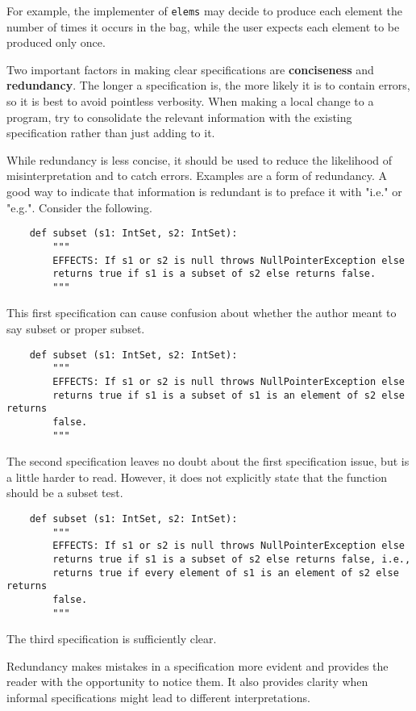 \documentclass[oneside,11pt,dvipsnames]{book}
\newcommand{\code}[1]{\texttt{#1}}
\begin{document}
For example, the implementer of \code{elems} may decide to produce each element the number of times it occurs in the bag, while the user expects each element to be produced only once.

Two important factors in making clear specifications are \textbf{conciseness} and \textbf{redundancy}. The longer a specification is, the more likely it is to contain errors, so it is best to avoid pointless verbosity. When making a local change to a program, try to consolidate the relevant information with the existing specification rather than just adding to it. 

While redundancy is less concise, it should be used to reduce the likelihood of misinterpretation and to catch errors. Examples are a form of redundancy. A good way to indicate that information is redundant is to preface it with "i.e." or "e.g.". Consider the following.
\begin{lstlisting}
    def subset (s1: IntSet, s2: IntSet):
        """
        EFFECTS: If s1 or s2 is null throws NullPointerException else
        returns true if s1 is a subset of s2 else returns false.
        """

\end{lstlisting}
This first specification can cause confusion about whether the author meant to say subset or proper subset. 
\begin{lstlisting}
    def subset (s1: IntSet, s2: IntSet):
        """
        EFFECTS: If s1 or s2 is null throws NullPointerException else
        returns true if s1 is a subset of s1 is an element of s2 else returns
        false.
        """
\end{lstlisting}
The second specification leaves no doubt about the first specification issue, but is a little harder to read. However, it does not explicitly state that the function should be a subset test.
\begin{lstlisting}
    def subset (s1: IntSet, s2: IntSet):
        """
        EFFECTS: If s1 or s2 is null throws NullPointerException else
        returns true if s1 is a subset of s2 else returns false, i.e.,
        returns true if every element of s1 is an element of s2 else returns
        false.
        """
\end{lstlisting}
The third specification is sufficiently clear.

Redundancy makes mistakes in a specification more evident and provides the reader with the opportunity to notice them. It also provides clarity when informal specifications might lead to different interpretations.
\end{document}
